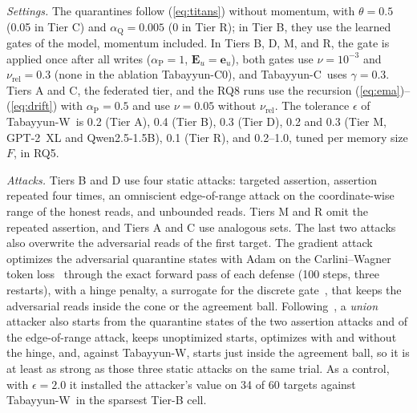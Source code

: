 \documentclass[journal]{IEEEtran}
\theoremstyle{remark}
\newcommand{\TabC}{\mbox{Tabayyun-C}}
\newcommand{\TabW}{\mbox{Tabayyun-W}}
\begin{document}
\emph{Settings.} The quarantines follow (\ref{eq:titans}) without momentum, with $\theta=0.5$ (0.05 in Tier C) and $\alpha_{\mathrm{Q}}=0.005$ (0 in Tier R); in Tier B, they use the learned gates of the model, momentum included. In Tiers B, D, M, and R, the gate is applied once after all writes ($\alpha_{\mathrm{P}}=1$, $\bm{E}_u=\bm{e}_u$), both gates use $\nu=10^{-3}$ and $\nu_{\mathrm{rel}}=0.3$ (none in the ablation \TabC0), and \TabC\ uses $\gamma=0.3$. Tiers A and C, the federated tier, and the RQ8 runs use the recursion (\ref{eq:ema})--(\ref{eq:drift}) with $\alpha_{\mathrm{P}}=0.5$ and use $\nu=0.05$ without $\nu_{\mathrm{rel}}$. The tolerance $\epsilon$ of \TabW\ is 0.2 (Tier A), 0.4 (Tier B), 0.3 (Tier D), 0.2 and 0.3 (Tier M, \mbox{GPT-2}~XL and \mbox{Qwen2.5-1.5B}), 0.1 (Tier R), and 0.2--1.0, tuned per memory size $F$, in RQ5.

\emph{Attacks.} Tiers B and D use four static attacks: targeted assertion, assertion repeated four times, an omniscient edge-of-range attack on the coordinate-wise range of the honest reads, and unbounded reads. Tiers M and R omit the repeated assertion, and Tiers A and C use analogous sets. The last two attacks also overwrite the adversarial reads of the first target. The gradient attack optimizes the adversarial quarantine states with Adam on the Carlini--Wagner token loss~\cite{carlini2017towards} through the exact forward pass of each defense (100 steps, three restarts), with a hinge penalty, a surrogate for the discrete gate~\cite{athalye2018obfuscated}, that keeps the adversarial reads inside the cone or the agreement ball. Following~\cite{tramer2020adaptive}, a \emph{union} attacker also starts from the quarantine states of the two assertion attacks and of the edge-of-range attack, keeps unoptimized starts, optimizes with and without the hinge, and, against \TabW, starts just inside the agreement ball, so it is at least as strong as those three static attacks on the same trial. As a control, with $\epsilon=2.0$ it installed the attacker's value on 34 of 60 targets against \TabW\ in the sparsest Tier-B cell.
\end{document}

